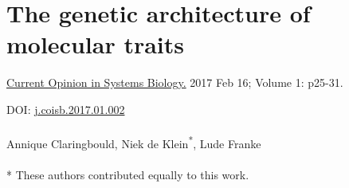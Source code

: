 \chapterfont{\huge\color{LightBlue}}  %
\sectionfont{\color{LightBlue}}  %
\subsectionfont{\color{LightBlue}}  %

\renewcommand\pcolor{LightBlue}
\renewcommand{\headrule}{\hbox to\headwidth{%
		\color{LightBlue}\leaders\hrule height \headrulewidth\hfill}} %
\fancyfoot[LE,RO]{\thepage}



\cleardoublepage
\makeatletter
\let\savedchap\@makechapterhead
\def\@makechapterhead{\vspace*{-3cm}\savedchap}
\chapter[The genetic architecture of molecular traits]{The genetic architecture of molecular traits}
\chaptermark{}
\let\@makechapterhead\savedchap
\makeatletter
\label{chap:chapter2-genetic-architecture}

\hfill \underline{Current Opinion in Systems Biology.} 2017 Feb 16; Volume 1: p25-31.

\hfill DOI: \href{https://doi.org/10.1016/j.coisb.2017.01.002}{j.coisb.2017.01.002}
\\
\\
Annique Claringbould\textsuperscript{\*}, Niek de Klein\textsuperscript{*}, Lude Franke\textsuperscript
\\
\\
* These authors contributed equally to this work.

\newpage

{ \Large {} }

